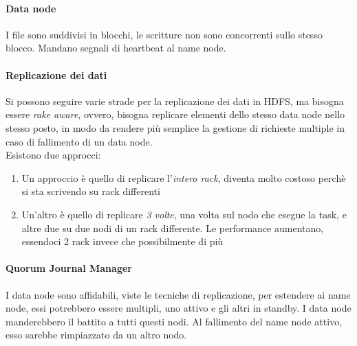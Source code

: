 \paragraph{Data node}
I file sono suddivisi in blocchi, le scritture non sono concorrenti sullo stesso 
blocco. Mandano segnali di heartbeat al name node.

\paragraph{Replicazione dei dati}
Si possono seguire varie strade per la replicazione dei dati in HDFS, ma bisogna 
essere \emph{rake aware}, ovvero, bisogna replicare elementi dello stesso data node nello
stesso posto, in modo da rendere più semplice la gestione di richieste multiple
in caso di fallimento di un data node.\\
Esistono due approcci:
\begin{enumerate}
        \item Un approccio è quello di replicare l'\emph{intero rack}, diventa molto costoso 
        perchè si sta scrivendo su rack differenti
        \item Un'altro è quello di replicare \emph{3 
        volte}, una volta sul nodo che esegue la task, e altre due su due nodi di un rack 
        differente. Le performance aumentano, essendoci 2 rack invece che possibilmente
        di più
\end{enumerate}
 
\paragraph{Quorum Journal Manager}
I data node sono affidabili, viste le tecniche di replicazione, per estendere
ai name node, essi potrebbero essere multipli, uno attivo e gli altri in standby.
I data node manderebbero il battito a tutti questi nodi. Al fallimento del name node 
attivo, esso sarebbe rimpiazzato da un altro nodo.

